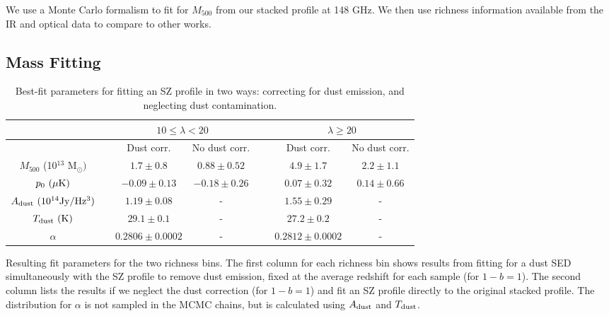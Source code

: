 \documentclass[a4paper,fleqn,usenatbib]{mnras}
\begin{document}
We use a Monte Carlo formalism to fit for $M_{500}$ from our stacked profile at 148 GHz. We then use richness information available from the IR and optical data to compare to other works.




\subsection{Mass Fitting}

\begin{table}
   
  \centering
  \caption{Best-fit parameters for fitting an SZ profile in two ways: correcting for dust emission, and neglecting dust contamination.}
  \begin{threeparttable}
  \begin{tabular}{|*{7}{c|}}
    \hline
    & & \multicolumn{2}{|c}{$10 \leq \lambda < 20$} & & \multicolumn{2}{|c|}{$\lambda \geq 20$} \\ \hline
    
    & & Dust corr. & No dust corr. & \ &  Dust corr. & No dust corr.  \\ \hline
    
    $M_{500}$ (10$^{13}$ M$_{\odot})$ & & $1.7 \pm 0.8$ & $0.88 \pm 0.52$ & \ & $4.9 \pm 1.7$  & $2.2 \pm 1.1$ \\ \hline
    
    $p_0 \ (\rm \mu K)$ & & $-0.09 \pm 0.13$ & $-0.18 \pm 0.26$ & \ & $0.07 \pm 0.32$ & $0.14 \pm 0.66$ \\ \hline
    
    $A_{\rm dust} \ (\rm 10^{14} Jy/Hz^3)$ & & $1.19 \pm 0.08$ & - & \ & $1.55 \pm 0.29$ & - \\ \hline
    
    $T_{\rm dust} \ (\rm K)$ & & $29.1 \pm 0.1$  & - & \ & $27.2 \pm 0.2$ & - \\ \hline \hline
    
    $\alpha$ & & $0.2806 \pm 0.0002$ & - & \ & $ 0.2812 \pm 0.0002 $ & - \\ \hline
    
    \end{tabular}
  \begin{tablenotes}
	\item Resulting fit parameters for the two richness bins. The first column for each richness bin shows results from fitting for a dust SED simultaneously with the SZ profile to remove dust emission, fixed at the average redshift for each sample (for $1-b=1$). The second column lists the results if we neglect the dust correction (for $1-b=1$) and fit an SZ profile directly to the original stacked profile. The distribution for $\alpha$ is not sampled in the MCMC chains, but is calculated using $A_{\rm dust}$ and $T_{\rm dust}$.
  \end{tablenotes}
  \end{threeparttable}
\label{table:mcmcfitparam}
\end{table}
\end{document}
